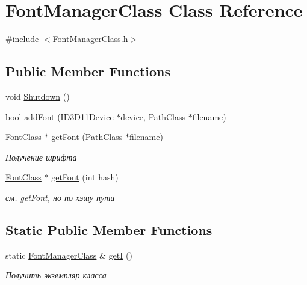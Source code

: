 \hypertarget{class_font_manager_class}{}\section{Font\+Manager\+Class Class Reference}
\label{class_font_manager_class}


{\ttfamily \#include $<$Font\+Manager\+Class.\+h$>$}

\subsection*{Public Member Functions}
\begin{DoxyCompactItemize}
\item 
void \hyperlink{class_font_manager_class_acab5a632a5ef3870ee09626fd71c69ef}{Shutdown} ()
\item 
bool \hyperlink{class_font_manager_class_a861f638433bafcf3697d797b13d5dd37}{add\+Font} (I\+D3\+D11\+Device $\ast$device, \hyperlink{class_path_class}{Path\+Class} $\ast$filename)
\item 
\hyperlink{class_font_class}{Font\+Class} $\ast$ \hyperlink{class_font_manager_class_acad8abc06d1bb36d2895083921c40c52}{get\+Font} (\hyperlink{class_path_class}{Path\+Class} $\ast$filename)
\begin{DoxyCompactList}\small\item\em Получение шрифта \end{DoxyCompactList}\item 
\hyperlink{class_font_class}{Font\+Class} $\ast$ \hyperlink{class_font_manager_class_a30b1b840630e586c9105881d897da75a}{get\+Font} (int hash)
\begin{DoxyCompactList}\small\item\em см. get\+Font, но по хэшу пути \end{DoxyCompactList}\end{DoxyCompactItemize}
\subsection*{Static Public Member Functions}
\begin{DoxyCompactItemize}
\item 
static \hyperlink{class_font_manager_class}{Font\+Manager\+Class} \& \hyperlink{class_font_manager_class_a666349d4b50faaa5afcd736e969d8f48}{getI} ()
\begin{DoxyCompactList}\small\item\em Получить экземпляр класса \end{DoxyCompactList}\end{DoxyCompactItemize}
